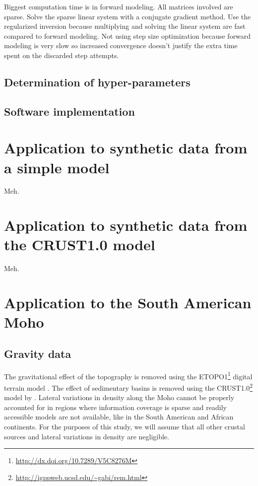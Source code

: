 \documentclass[extra,mreferee]{gji}
\begin{document}
Biggest computation time is in forward modeling.
All matrices involved are sparse.
Solve the sparse linear system with a conjugate gradient method.
Use the regularized inversion because multiplying and solving the linear system
are fast compared to forward modeling.
Not using step size optimization because forward modeling is very slow so
increased convergence doesn't justify the extra time spent on the discarded
step attempts.

\subsection{Determination of hyper-parameters}



\subsection{Software implementation}



\section{Application to synthetic data from a simple model}


Meh.


\section{Application to synthetic data from the CRUST1.0 model}

Meh.


\section{Application to the South American Moho}


\subsection{Gravity data}

The gravitational effect of the topography
is removed using the
ETOPO1\footnote{\url{http://dx.doi.org/10.7289/V5C8276M}}
digital terrain model
\citep{amante_c._and_b._w._eakins_etopo1_2009}.
The effect of sedimentary basins is removed using the
CRUST1.0\footnote{\url{http://igppweb.ucsd.edu/~gabi/rem.html}} model
by
\citet{laske_update_2013}.
Lateral variations in density along the Moho cannot be properly accounted for
in regions where information coverage is sparse and readily accessible models
are not available, like in the South American and African continents.
For the purposes of this study, we will assume that all other crustal sources
and lateral variations in density are negligible.
\end{document}
